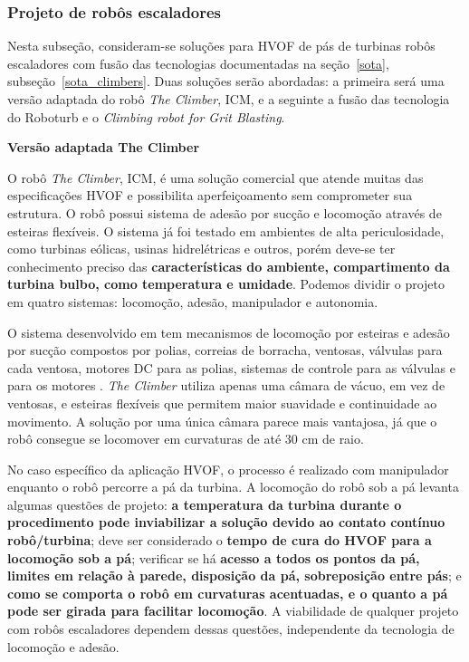 \subsubsection{Projeto de robôs escaladores}\label{proj_climbers}

Nesta subseção, consideram-se soluções para HVOF de pás de turbinas robôs
escaladores com fusão das tecnologias documentadas na
seção~\ref{sota}, subseção~\ref{sota_climbers}. Duas soluções serão abordadas:
a primeira será uma versão adaptada do robô \emph{The Climber}, ICM, e a
seguinte a fusão das tecnologia do Roboturb e o \emph{Climbing robot for Grit
Blasting}.

\textbf{Versão adaptada The Climber}  

O robô \emph{The Climber}, ICM, é uma solução comercial que atende muitas das
especificações HVOF e possibilita aperfeiçoamento sem comprometer sua
estrutura. O robô possui sistema de adesão por sucção e locomoção através de
esteiras flexíveis. O sistema já foi testado em ambientes de alta
periculosidade, como turbinas eólicas, usinas hidrelétricas e outros, porém
deve-se ter conhecimento preciso das \textbf{características do ambiente,
compartimento da turbina bulbo, como temperatura e umidade}. Podemos dividir o
projeto em quatro sistemas: locomoção, adesão, manipulador e autonomia.

O sistema desenvolvido em \cite{kim2008development} tem mecanismos de
locomoção por esteiras e adesão por sucção compostos por polias, correias de
borracha, ventosas, válvulas para cada ventosa, motores DC para as polias,
sistemas de controle para as válvulas e para os motores . \emph{The Climber}
utiliza apenas uma câmara de vácuo, em vez de ventosas, e esteiras flexíveis que
permitem maior suavidade e continuidade ao movimento. A solução por uma única
câmara parece mais vantajosa, já que o robô consegue se locomover em curvaturas
de até 30 cm de raio.

No caso específico da aplicação HVOF, o processo é realizado com
manipulador enquanto o robô percorre a pá da turbina. A locomoção do
robô sob a pá levanta algumas questões de projeto: \textbf{a
temperatura da turbina durante o procedimento pode inviabilizar a solução
devido ao contato contínuo robô/turbina}; deve ser considerado o \textbf{tempo
de cura do HVOF para a locomoção sob a pá}; verificar se há \textbf{acesso a
todos os pontos da pá, limites em relação à parede, disposição da pá,
sobreposição entre pás}; e \textbf{como se comporta o robô em curvaturas
acentuadas, e o quanto a pá pode ser girada para facilitar locomoção}. A
viabilidade de qualquer projeto com robôs escaladores dependem dessas questões,
independente da tecnologia de locomoção e adesão.

